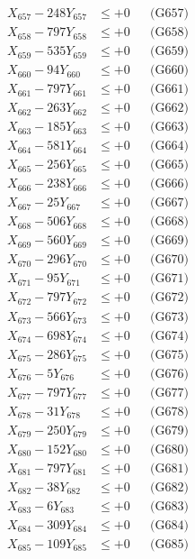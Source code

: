 \documentclass[a4paper,10pt]{article}
\begin{document}
{\begin{align}
X_{657} - 248Y_{657} &\leq +0 && \text{(G657)} \\
X_{658} - 797Y_{658} &\leq +0 && \text{(G658)} \\
X_{659} - 535Y_{659} &\leq +0 && \text{(G659)} \\
X_{660} - 94Y_{660} &\leq +0 && \text{(G660)} \\
\allowbreak
X_{661} - 797Y_{661} &\leq +0 && \text{(G661)} \\
X_{662} - 263Y_{662} &\leq +0 && \text{(G662)} \\
X_{663} - 185Y_{663} &\leq +0 && \text{(G663)} \\
X_{664} - 581Y_{664} &\leq +0 && \text{(G664)} \\
X_{665} - 256Y_{665} &\leq +0 && \text{(G665)} \\
X_{666} - 238Y_{666} &\leq +0 && \text{(G666)} \\
X_{667} - 25Y_{667} &\leq +0 && \text{(G667)} \\
X_{668} - 506Y_{668} &\leq +0 && \text{(G668)} \\
X_{669} - 560Y_{669} &\leq +0 && \text{(G669)} \\
X_{670} - 296Y_{670} &\leq +0 && \text{(G670)} \\
\allowbreak
X_{671} - 95Y_{671} &\leq +0 && \text{(G671)} \\
X_{672} - 797Y_{672} &\leq +0 && \text{(G672)} \\
X_{673} - 566Y_{673} &\leq +0 && \text{(G673)} \\
X_{674} - 698Y_{674} &\leq +0 && \text{(G674)} \\
X_{675} - 286Y_{675} &\leq +0 && \text{(G675)} \\
X_{676} - 5Y_{676} &\leq +0 && \text{(G676)} \\
X_{677} - 797Y_{677} &\leq +0 && \text{(G677)} \\
X_{678} - 31Y_{678} &\leq +0 && \text{(G678)} \\
X_{679} - 250Y_{679} &\leq +0 && \text{(G679)} \\
X_{680} - 152Y_{680} &\leq +0 && \text{(G680)} \\
\allowbreak
X_{681} - 797Y_{681} &\leq +0 && \text{(G681)} \\
X_{682} - 38Y_{682} &\leq +0 && \text{(G682)} \\
X_{683} - 6Y_{683} &\leq +0 && \text{(G683)} \\
X_{684} - 309Y_{684} &\leq +0 && \text{(G684)} \\
X_{685} - 109Y_{685} &\leq +0 && \text{(G685)} \\

\end{align}}
\end{document}
